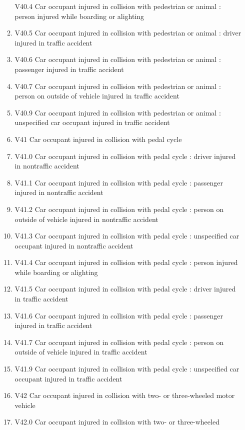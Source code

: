 \documentclass[
]{scrartcl}
\begin{document}
\begin{itemize}
\begin{enumerate}
    V40.4 Car occupant injured in collision with pedestrian or animal :
    person injured while boarding or alighting
  \item
    V40.5 Car occupant injured in collision with pedestrian or animal :
    driver injured in traffic accident
  \item
    V40.6 Car occupant injured in collision with pedestrian or animal :
    passenger injured in traffic accident
  \item
    V40.7 Car occupant injured in collision with pedestrian or animal :
    person on outside of vehicle injured in traffic accident
  \item
    V40.9 Car occupant injured in collision with pedestrian or animal :
    unspecified car occupant injured in traffic accident
  \item
    V41 Car occupant injured in collision with pedal cycle
  \item
    V41.0 Car occupant injured in collision with pedal cycle : driver
    injured in nontraffic accident
  \item
    V41.1 Car occupant injured in collision with pedal cycle : passenger
    injured in nontraffic accident
  \item
    V41.2 Car occupant injured in collision with pedal cycle : person on
    outside of vehicle injured in nontraffic accident
  \item
    V41.3 Car occupant injured in collision with pedal cycle :
    unspecified car occupant injured in nontraffic accident
  \item
    V41.4 Car occupant injured in collision with pedal cycle : person
    injured while boarding or alighting
  \item
    V41.5 Car occupant injured in collision with pedal cycle : driver
    injured in traffic accident
  \item
    V41.6 Car occupant injured in collision with pedal cycle : passenger
    injured in traffic accident
  \item
    V41.7 Car occupant injured in collision with pedal cycle : person on
    outside of vehicle injured in traffic accident
  \item
    V41.9 Car occupant injured in collision with pedal cycle :
    unspecified car occupant injured in traffic accident
  \item
    V42 Car occupant injured in collision with two- or three-wheeled
    motor vehicle
  \item
    V42.0 Car occupant injured in collision with two- or three-wheeled

\end{enumerate}
\end{itemize}
\end{document}
